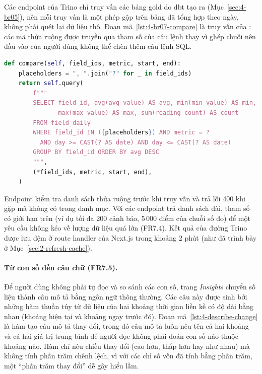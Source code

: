 Các endpoint của Trino chỉ truy vấn các bảng gold do dbt tạo ra (Mục~\ref{sec:4-br05}), nên mỗi truy vấn là một phép gộp trên bảng đã tổng hợp theo ngày, không phải quét lại dữ liệu thô. Đoạn mã~\ref{lst:4-br07-compare} là truy vấn của : các mã thửa ruộng được truyền qua tham số của câu lệnh thay vì ghép chuỗi nên đầu vào của người dùng không thể chèn thêm câu lệnh SQL.

\begin{lstlisting}[language=Python, caption={Truy vấn so sánh các thửa ruộng}, label={lst:4-br07-compare}]
def compare(self, field_ids, metric, start, end):
    placeholders = ", ".join("?" for _ in field_ids)
    return self.query(
        f"""
        SELECT field_id, avg(avg_value) AS avg, min(min_value) AS min,
               max(max_value) AS max, sum(reading_count) AS count
        FROM field_daily
        WHERE field_id IN ({placeholders}) AND metric = ?
          AND day >= CAST(? AS date) AND day <= CAST(? AS date)
        GROUP BY field_id ORDER BY avg DESC
        """,
        (*field_ids, metric, start, end),
    )
\end{lstlisting}

Endpoint kiểm tra danh sách thửa ruộng trước khi truy vấn và trả lỗi 400 khi gặp mã không có trong danh mục. Với các endpoint trả danh sách dài, tham số  có giới hạn trên (ví dụ tối đa 200 cảnh báo, 5\,000 điểm của chuỗi số đo) để một yêu cầu không kéo về lượng dữ liệu quá lớn (FR7.4). Kết quả của đường Trino được lưu đệm ở route handler của Next.js trong khoảng 2 phút (như đã trình bày ở Mục~\ref{sec:2-refresh-cache}).

\paragraph{Từ con số đến câu chữ (FR7.5).} Để người dùng không phải tự đọc và so sánh các con số, trang \emph{Insights} chuyển số liệu thành câu mô tả bằng ngôn ngữ thông thường. Các câu này được sinh bởi những hàm thuần túy từ dữ liệu của hai khoảng thời gian liền kề có độ dài bằng nhau (khoảng hiện tại và khoảng ngay trước đó). Đoạn mã~\ref{lst:4-describe-change} là hàm tạo câu mô tả thay đổi, trong đó câu mô tả luôn nêu tên cả hai khoảng và cả hai giá trị trung bình để người đọc không phải đoán con số nào thuộc khoảng nào. Hàm chỉ nêu chiều thay đổi (cao hơn, thấp hơn hay như nhau) mà không tính phần trăm chênh lệch, vì với các chỉ số vốn đã tính bằng phần trăm, một ``phần trăm thay đổi'' dễ gây hiểu lầm.

